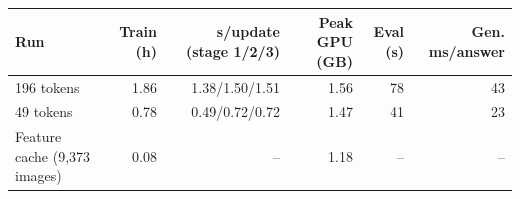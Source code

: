 \begin{tabular}{lrrrrr}
\toprule
Run & Train (h) & s/update (stage 1/2/3) & Peak GPU (GB) & Eval (s) & Gen. ms/answer \\
\midrule
196 tokens & 1.86 & 1.38/1.50/1.51 & 1.56 & 78 & 43 \\
49 tokens & 0.78 & 0.49/0.72/0.72 & 1.47 & 41 & 23 \\
\midrule
Feature cache (9,373 images) & 0.08 & -- & 1.18 & -- & -- \\
\bottomrule
\end{tabular}
